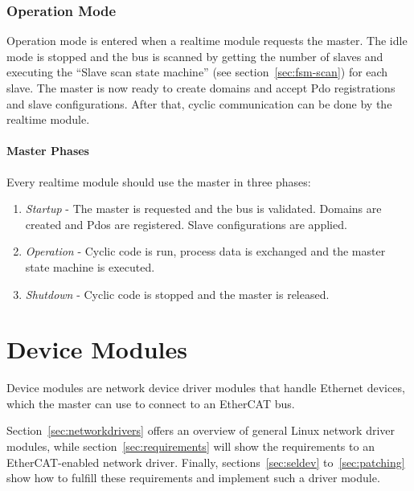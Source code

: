 \documentclass[a4paper,12pt,BCOR6mm,bibtotoc,idxtotoc]{scrbook}
\begin{document}
\subsubsection{Operation Mode}

Operation mode is entered when a realtime module requests the master.
The idle mode is stopped and the bus is scanned by getting the number
of slaves and executing the ``Slave scan state machine'' (see
section~\ref{sec:fsm-scan}) for each slave. The master is now ready to
create domains and accept Pdo registrations and slave configurations.
After that, cyclic communication can be done by the realtime module.

\paragraph{Master Phases}

Every realtime module should use the master in three phases:

\begin{enumerate}
\item \textit{Startup} - The master is requested and the bus is
  validated. Domains are created and Pdos are registered. Slave
  configurations are applied.
\item \textit{Operation} - Cyclic code is run, process data is
  exchanged and the master state machine is executed.
\item \textit{Shutdown} - Cyclic code is stopped and the master
  is released.
\end{enumerate}


\section{Device Modules}
\label{sec:device}

Device modules are network device driver modules that handle Ethernet
devices, which the master can use to connect to an EtherCAT bus.

Section~\ref{sec:networkdrivers} offers an overview of general Linux
network driver modules, while section~\ref{sec:requirements} will show
the requirements to an EtherCAT-enabled network driver. Finally,
sections~\ref{sec:seldev} to~\ref{sec:patching} show how to fulfill
these requirements and implement such a driver module.
\end{document}
